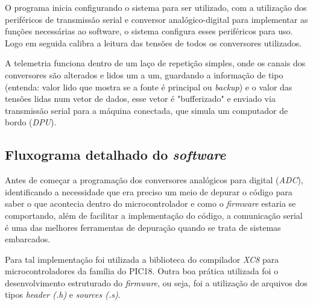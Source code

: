 \documentclass[
	12pt,				%
	openright,			%
	oneside,			%
	a4paper,			%
	english,			%
	french,				%
	spanish,			%
	brazil,				%
	oldfontcommands
	]{abntex2}
\begin{document}
	O programa inicia configurando o sistema para ser utilizado, com a utilização dos periféricos de transmissão serial e conversor analógico-digital para implementar as funções necessárias ao software, o sistema configura esses periféricos para uso. Logo em seguida calibra a leitura das tensões de todos os conversores utilizados.
	
	A telemetria funciona dentro de um laço de repetição simples, onde os canais dos conversores são alterados e lidos um a um, guardando a informação de tipo (entenda: valor lido que mostra se a fonte é principal ou \textit{backup}) e o valor das tensões lidas num vetor de dados, esse vetor é "bufferizado" e enviado via transmissão serial para a máquina conectada, que simula um computador de bordo (\textit{DPU}).  

\subsection[Fluxograma detalhado do software]{Fluxograma detalhado do \textit{software}}

	Antes de começar a programação dos conversores analógicos para digital (\textit{ADC}), identificando a necessidade que era preciso um meio de depurar o código para saber o que acontecia dentro do microcontrolador e como o \textit{firmware} estaria se comportando, além de facilitar a implementação do código, a comunicação serial é uma das melhores ferramentas de depuração quando se trata de sistemas embarcados.
	
	Para tal implementação foi utilizada a biblioteca do compilador \textit{XC8} para microcontroladores da família do PIC18. Outra boa prática utilizada foi o desenvolvimento estruturado do \textit{firmware}, ou seja, foi a utilização de arquivos dos tipos \textit{header (.h)} e \textit{sources (.s)}.
	
\end{document}
